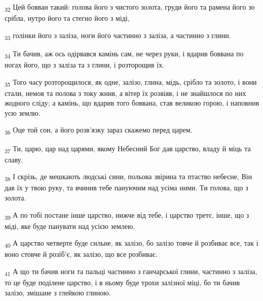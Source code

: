 \begin{tcolorbox}
\textsubscript{32} Цей бовван такий: голова його з чистого золота, груди його та рамена його зо срібла, нутро його та стегно його з міді,
\end{tcolorbox}
\begin{tcolorbox}
\textsubscript{33} голінки його з заліза, ноги його частинно з заліза, а частинно з глини.
\end{tcolorbox}
\begin{tcolorbox}
\textsubscript{34} Ти бачив, аж ось одірвався камінь сам, не через руки, і вдарив боввана по ногах його, що з заліза та з глини, і розторощив їх.
\end{tcolorbox}
\begin{tcolorbox}
\textsubscript{35} Того часу розторощилося, як одне, залізо, глина, мідь, срібло та золото, і вони стали, немов та полова з току жнив, а вітер їх розвіяв, і не знайшлося по них жодного сліду; а камінь, що вдарив того боввана, став великою горою, і наповнив усю землю.
\end{tcolorbox}
\begin{tcolorbox}
\textsubscript{36} Оце той сон, а його розв'язку зараз скажемо перед царем.
\end{tcolorbox}
\begin{tcolorbox}
\textsubscript{37} Ти, царю, цар над царями, якому Небесний Бог дав царство, владу й міць та славу.
\end{tcolorbox}
\begin{tcolorbox}
\textsubscript{38} І скрізь, де мешкають людські сини, польова звірина та птаство небесне, Він дав їх у твою руку, та вчинив тебе пануючим над усіма ними. Ти голова, що з золота.
\end{tcolorbox}
\begin{tcolorbox}
\textsubscript{39} А по тобі постане інше царство, нижче від тебе, і царство третє, інше, що з міді, яке буде панувати над усією землею.
\end{tcolorbox}
\begin{tcolorbox}
\textsubscript{40} А царство четверте буде сильне, як залізо, бо залізо товче й розбиває все, так і воно стовче й розіб'є, як залізо, що все розбиває.
\end{tcolorbox}
\begin{tcolorbox}
\textsubscript{41} А що ти бачив ноги та пальці частинно з ганчарської глини, частинно з заліза, то це буде поділене царство, і в ньому буде трохи залізної міці, бо ти бачив залізо, змішане з глейкою глиною.
\end{tcolorbox}

